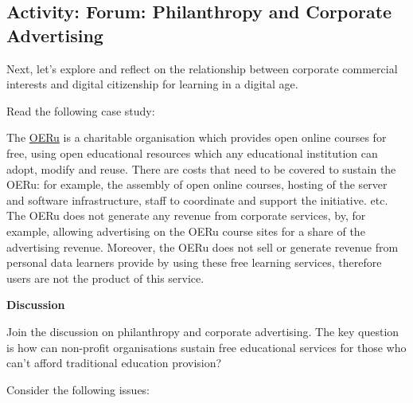 \documentclass[
]{book}
\theoremstyle{definition}
\theoremstyle{definition}
\theoremstyle{definition}
\theoremstyle{definition}
\theoremstyle{remark}
\begin{document}
\hypertarget{activity-forum-philanthropy-and-corporate-advertising}{%
\subsection*{Activity: Forum: Philanthropy and Corporate Advertising}\label{activity-forum-philanthropy-and-corporate-advertising}}

\begin{reflect}
Next, let's explore and reflect on the relationship between corporate commercial interests and digital citizenship for learning in a digital age.

Read the following case study:

The \href{https://oeru.org/}{OERu} is a charitable organisation which provides open online courses for free, using open educational resources which any educational institution can adopt, modify and reuse. There are costs that need to be covered to sustain the OERu: for example, the assembly of open online courses, hosting of the server and software infrastructure, staff to coordinate and support the initiative. etc. The OERu does not generate any revenue from corporate services, by, for example, allowing advertising on the OERu course sites for a share of the advertising revenue. Moreover, the OERu does not sell or generate revenue from personal data learners provide by using these free learning services, therefore users are not the product of this service.

\textbf{Discussion}

Join the discussion on philanthropy and corporate advertising. The key question is how can non-profit organisations sustain free educational services for those who can't afford traditional education provision?

Consider the following issues:


\end{reflect}
\end{document}
